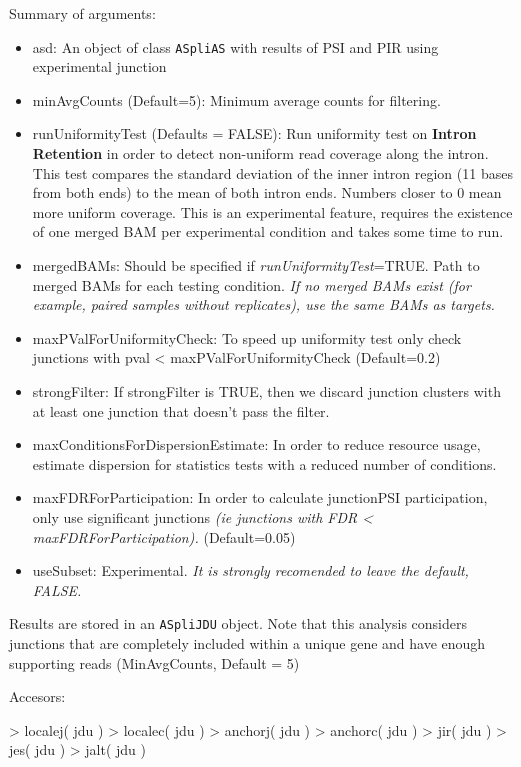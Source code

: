 \documentclass{article}
\begin{document}
Summary of arguments:
\begin{itemize}
\item asd: An object of class \texttt{ASpliAS} with results of PSI and PIR using experimental junction
\item minAvgCounts (Default=5): Minimum average counts for filtering. 
\item runUniformityTest  (Defaults =   FALSE): Run uniformity test on \textbf{Intron Retention} in order to detect non-uniform read coverage along the intron. This test compares the standard deviation of the inner intron region (11 bases from both ends) to the mean of both intron ends. Numbers closer to 0 mean more uniform coverage. This is an experimental feature, requires the existence of one merged BAM per experimental condition and takes some time to run. 
\item mergedBAMs: Should be specified if {\em runUniformityTest}=TRUE. Path to merged BAMs for each testing condition. \textit{ If no merged BAMs exist (for example, paired samples without replicates), use the same BAMs as targets.}
\item maxPValForUniformityCheck: To speed up uniformity test only check junctions with pval < maxPValForUniformityCheck (Default=0.2)
\item strongFilter: If strongFilter is TRUE, then we discard junction clusters with at least one junction that doesn't pass the filter.
\item  maxConditionsForDispersionEstimate: In order to reduce resource usage, estimate dispersion for statistics tests with a reduced number of conditions.
\item maxFDRForParticipation: In order to calculate junctionPSI participation, only use significant junctions \textit {(ie junctions with FDR < maxFDRForParticipation).} (Default=0.05)
\item useSubset: Experimental. \textit{It is strongly recomended to leave the default, FALSE.}
\end{itemize}

Results are stored in an \texttt{ASpliJDU} object. Note that this analysis considers junctions that are completely included within a unique gene and have enough supporting reads (MinAvgCounts, Default = 5)

Accesors:

\begin{Schunk}
\begin{Sinput}
>  localej( jdu )
>  localec( jdu )
>  anchorj( jdu )
>  anchorc( jdu )
>  jir( jdu )
>  jes( jdu )
>  jalt( jdu )
\end{Sinput}
\end{Schunk}
\end{document}

